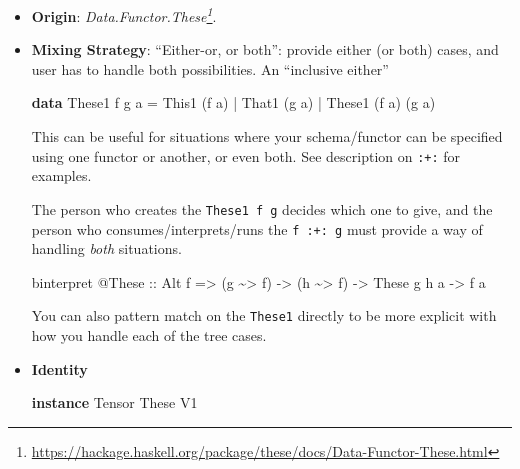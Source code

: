 \documentclass[]{article}
\newenvironment{Shaded}{}{}
\newcommand{\DataTypeTok}[1]{\textcolor[rgb]{0.56,0.13,0.00}{#1}}
\newcommand{\KeywordTok}[1]{\textcolor[rgb]{0.00,0.44,0.13}{\textbf{#1}}}
\newcommand{\NormalTok}[1]{#1}
\newcommand{\OperatorTok}[1]{\textcolor[rgb]{0.40,0.40,0.40}{#1}}
\newcommand{\OtherTok}[1]{\textcolor[rgb]{0.00,0.44,0.13}{#1}}
\renewcommand{\href}[2]{#2\footnote{\url{#1}}}
\begin{document}
\begin{itemize}
\item
  \textbf{Origin}:
  \emph{\href{https://hackage.haskell.org/package/these/docs/Data-Functor-These.html}{Data.Functor.These}}.
\item
  \textbf{Mixing Strategy}: ``Either-or, or both'': provide either (or both)
  cases, and user has to handle both possibilities. An ``inclusive either''

\begin{Shaded}
\begin{Highlighting}[]
\KeywordTok{data} \DataTypeTok{These1}\NormalTok{ f g a}
    \OtherTok{=} \DataTypeTok{This1}\NormalTok{  (f a)}
    \OperatorTok{|} \DataTypeTok{That1}\NormalTok{        (g a)}
    \OperatorTok{|} \DataTypeTok{These1}\NormalTok{ (f a) (g a)}
\end{Highlighting}
\end{Shaded}

  This can be useful for situations where your schema/functor can be specified
  using one functor or another, or even both. See description on \texttt{:+:}
  for examples.

  The person who creates the \texttt{These1\ f\ g} decides which one to give,
  and the person who consumes/interprets/runs the \texttt{f\ :+:\ g} must
  provide a way of handling \emph{both} situations.

\begin{Shaded}
\begin{Highlighting}[]
\NormalTok{binterpret }\OperatorTok{@}\DataTypeTok{These}
\OtherTok{    ::} \DataTypeTok{Alt}\NormalTok{ f}
    \OtherTok{=\textgreater{}}\NormalTok{ (g }\OperatorTok{\textasciitilde{}\textgreater{}}\NormalTok{ f)}
    \OtherTok{{-}\textgreater{}}\NormalTok{ (h }\OperatorTok{\textasciitilde{}\textgreater{}}\NormalTok{ f)}
    \OtherTok{{-}\textgreater{}} \DataTypeTok{These}\NormalTok{ g h a}
    \OtherTok{{-}\textgreater{}}\NormalTok{ f a}
\end{Highlighting}
\end{Shaded}

  You can also pattern match on the \texttt{These1} directly to be more explicit
  with how you handle each of the tree cases.
\item
  \textbf{Identity}

\begin{Shaded}
\begin{Highlighting}[]
\KeywordTok{instance} \DataTypeTok{Tensor} \DataTypeTok{These} \DataTypeTok{V1}
\end{Highlighting}
\end{Shaded}


\end{itemize}
\end{document}
